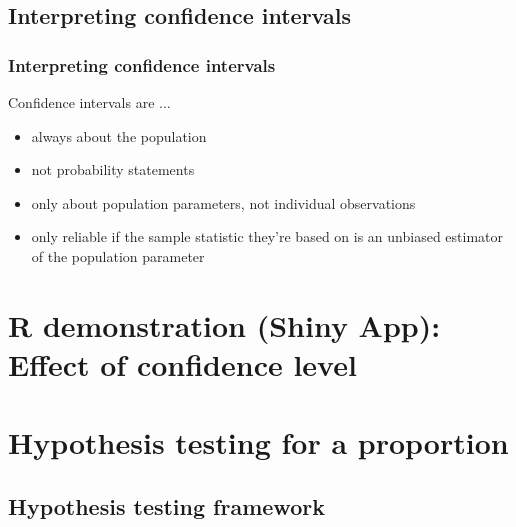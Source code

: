 \documentclass[t,compress,mathserif]{beamer}
\begin{document}

\subsection{Interpreting confidence intervals}


\begin{frame}
\frametitle{Interpreting confidence intervals}

Confidence intervals are ...

\begin{itemize}

\item always about the population

\item not probability statements 

\item only about population parameters, not individual observations

\item only reliable if the sample statistic they're based on is an unbiased estimator of the population parameter

\end{itemize}

\end{frame}


\section{R demonstration (Shiny App): Effect of confidence level}



\section{Hypothesis testing for a proportion}


\subsection{Hypothesis testing framework}

\end{document}
